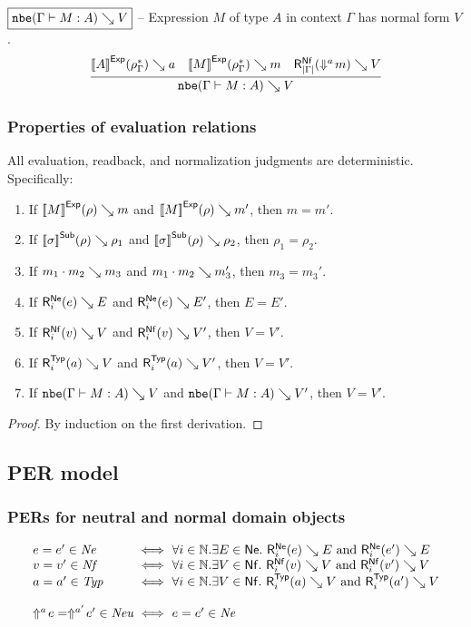 \noindent
$\boxed{\texttt{nbe}(\Gamma \vdash M : A) \searrow V}$ -- Expression $M$ of type $A$ in context $\Gamma$ has normal form $V$.
\[
\infer{
  \nbeexp \Gamma M A V
}{
  \evalexp A {\denvinit \Gamma} a
  &
  \evalexp M {\denvinit \Gamma} m
  &
  \rbnf[|\Gamma|] {\dreify a m} V
}
\]

\subsubsection{Properties of evaluation relations}

\begin{lemma}[Determinacy]
  All evaluation, readback, and normalization judgments are deterministic.
  Specifically:
  \begin{enumerate}
  \item If ${[\![M]\!]}^{\mathsf{Exp}}(\rho) \searrow m$ and ${[\![M]\!]}^{\mathsf{Exp}}(\rho) \searrow m'$, then $m = m'$.
  \item If ${[\![\sigma]\!]}^{\mathsf{Sub}}(\rho) \searrow \rho_1$ and ${[\![\sigma]\!]}^{\mathsf{Sub}}(\rho) \searrow \rho_2$, then $\rho_1 = \rho_2$.
  \item If $m_1 \cdot m_2 \searrow m_3$ and $m_1 \cdot m_2 \searrow m_3'$, then $m_3 = m_3'$.
  \item If $\rbne e E$ and $\rbne e {E'}$, then $E = E'$.
  \item If $\rbnf v V$ and $\rbnf v {V'}$, then $V = V'$.
  \item If $\rbtyp a V$ and $\rbtyp a {V'}$, then $V = V'$.
  \item If $\texttt{nbe}(\Gamma \vdash M : A) \searrow V$ and $\texttt{nbe}(\Gamma \vdash M : A) \searrow V'$, then $V = V'$.
  \end{enumerate}
\end{lemma}
\begin{proof}
  By induction on the first derivation.
\end{proof}



\subsection{PER model}

\subsubsection{PERs for neutral and normal domain objects}

\[
\begin{array}{l@{~\iff~}l}
  \perrel e {e'} \perne  & \forall i \in \Nat.\exists E \in \Ne.\ \rbne e E ~ \text{and} ~ \rbne {e'} E \\
  \perrel v {v'} \pernf  & \forall i \in \Nat.\exists V \in \Nf.\ \rbnf v V ~ \text{and} ~ \rbnf {v'} V \\
  \perrel a {a'} \pertyp & \forall i \in \Nat.\exists V \in \Nf.\ \rbtyp a V ~ \text{and} ~ \rbtyp {a'} V \\[12pt]
  \perrel {\dreflect a e} {\dreflect {a'} {e'}} \perneu & \perrel e {e'} \perne
\end{array}
\]


